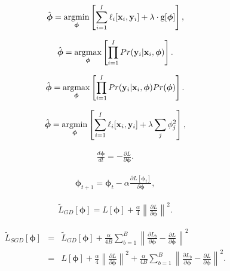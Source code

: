 \documentclass[letterpaper,twoside,openany, titlepage,oldfontcommands,titles,dvipsnames]{memoir}
\begin{document}
\begin{eqnarray}
 \hat{\boldsymbol\phi} = \mathop{\rm argmin}_{\boldsymbol\phi}\left[\sum_{i=1}^{I}\ell_{i}[\mathbf{x}_{i},\mathbf{y}_{i}] + \lambda \cdot \mbox{g}[\boldsymbol\phi]\right],
 \end{eqnarray}

\begin{eqnarray}
 \hat{\boldsymbol\phi} = \mathop{\rm argmax}_{\boldsymbol\phi}\left[\prod_{i=1}^{I}Pr(\mathbf{y}_{i}|\mathbf{x}_{i},\boldsymbol\phi)\right].
 \end{eqnarray}

\begin{eqnarray}
 \hat{\boldsymbol\phi} = \mathop{\rm argmax}_{\boldsymbol\phi}\left[\prod_{i=1}^{I}Pr(\mathbf{y}_{i}|\mathbf{x}_{i},\boldsymbol\phi)Pr(\boldsymbol\phi)\right].
 \end{eqnarray}

\begin{eqnarray}\label{eq:reg_l2}
 \hat{\boldsymbol\phi} = \mathop{\rm argmin}_{\boldsymbol\phi}\left[\sum_{i=1}^{I}\ell_{i}[\mathbf{x}_{i},\mathbf{y}_{i}] + \lambda \sum_{j}\phi_{j}^{2}\right],
 \end{eqnarray}

\begin{eqnarray}\label{eq:reg_implicit}
  \frac{d\boldsymbol\phi}{dt} = -\frac{\partial L}{\partial\boldsymbol\phi}.
 \end{eqnarray}

\begin{eqnarray}
  \boldsymbol\phi_{t+1} = \boldsymbol\phi_{t}-\alpha \frac{\partial L[\boldsymbol\phi_{t}]}{\partial\boldsymbol\phi},
 \end{eqnarray}

\begin{eqnarray}\label{eq:reg_imp_gd}
  \tilde{L}_{GD}[\boldsymbol\phi] = L[\boldsymbol\phi] + \frac{\alpha}{4} \left\lVert\frac{\partial L}{\partial \boldsymbol\phi} \right\rVert^{2}.
 \end{eqnarray}

\begin{eqnarray}\label{eq:reg_imp_sgd}
  \tilde{L}_{SGD}[\boldsymbol\phi] &=& \tilde{L}_{GD}[\boldsymbol\phi]+\frac{\alpha}{4 B}\sum_{b=1}^{B}\left\lVert\frac{\partial L_{b}}{\partial \boldsymbol\phi} - \frac{\partial L}{\partial \boldsymbol\phi} \right\rVert^{2}\nonumber \\
  &=& L[\boldsymbol\phi] + \frac{\alpha}{4} \left\lVert\frac{\partial L}{\partial \boldsymbol\phi} \right\rVert^{2}+\frac{\alpha}{4 B}\sum_{b=1}^{B}\left\lVert\frac{\partial L_{b}}{\partial \boldsymbol\phi} - \frac{\partial L}{\partial \boldsymbol\phi} \right\rVert^{2}.
 \end{eqnarray}
\end{document}
